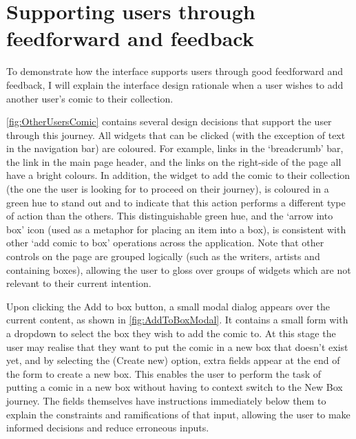 \documentclass[fontsize=12pt,a4paper]{scrreprt}
\begin{document}
\newpage

\section{Supporting users through feedforward and feedback}


To demonstrate how the interface supports users through good feedforward and feedback, I will explain the interface design rationale when a user wishes to add another user's comic to their collection.

\autoref{fig:OtherUsersComic} contains several design decisions that support the user through this journey. All widgets that can be clicked (with the exception of text in the navigation bar) are coloured. For example, links in the `breadcrumb' bar, the link in the main page header, and the links on the right-side of the page all have a bright colours. In addition, the widget to add the comic to their collection (the one the user is looking for to proceed on their journey), is coloured in a green hue to stand out and to indicate that this action performs a different type of action than the others. This distinguishable green hue, and the `arrow into box' icon (used as a metaphor for placing an item into a box), is consistent with other `add comic to box' operations across the application. Note that other controls on the page are grouped logically (such as the writers, artists and containing boxes), allowing the user to gloss over groups of widgets which are not relevant to their current intention.

Upon clicking the \textsf{Add to box} button, a small modal dialog appears over the current content, as shown in \autoref{fig:AddToBoxModal}. It contains a small form with a dropdown to select the box they wish to add the comic to. At this stage the user may realise that they want to put the comic in a new box that doesn't exist yet, and by selecting the \textsf{(Create new)} option, extra fields appear at the end of the form to create a new box. This enables the user to perform the task of putting a comic in a new box without having to context switch to the \textsf{New Box} journey. The fields themselves have instructions immediately below them to explain the constraints and ramifications of that input, allowing the user to make informed decisions and reduce erroneous inputs.
\end{document}
